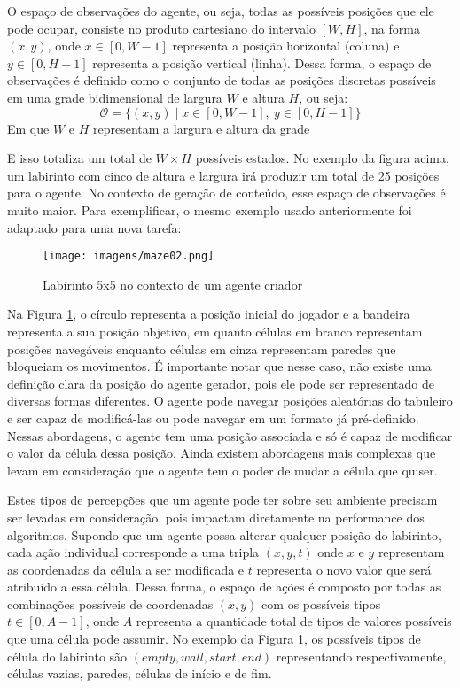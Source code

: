 O espaço de observações do agente, ou seja, todas as possíveis posições que ele pode ocupar, 
consiste no produto cartesiano do intervalo \([W, H]\), na forma \((x, y)\), onde \(x \in [0, W-1]\) 
representa a posição horizontal (coluna) e \(y \in [0, H-1]\) representa a posição vertical (linha). 
Dessa forma, o espaço de observações é definido como o conjunto de todas as posições discretas possíveis 
em uma grade bidimensional de largura \(W\) e altura \(H\), ou seja:
\[
\mathcal{O} = \{(x, y) \mid x \in [0, W-1],\ y \in [0, H-1]\}
\]
\noindent Em que \(W\) e \(H\) representam a largura e altura da grade

E isso totaliza um total de \(W \times H\) possíveis estados. No exemplo da figura acima, um labirinto com 
cinco de altura e largura irá produzir um total de 25 posições para o agente. No contexto de geração de
conteúdo, esse espaço de observações é muito maior. Para exemplificar, o mesmo exemplo usado anteriormente
foi adaptado para uma nova tarefa:

\begin{figure}[htb]
	\caption{\label{ref-maze02}Labirinto 5x5 no contexto de um agente criador}
	\begin{center}
	    \texttt{[image: imagens/maze02.png]}
	\end{center}
\end{figure}

\FloatBarrier

Na Figura \ref{ref-maze02}, o círculo representa a posição inicial do jogador e a bandeira 
representa a sua posição objetivo, em quanto células em branco representam
posições navegáveis enquanto células em cinza representam paredes que bloqueiam os
movimentos. É importante notar que nesse caso, não existe uma definição clara da posição
do agente gerador, pois ele pode ser representado de diversas formas diferentes.
O agente pode navegar posições aleatórias do tabuleiro e ser capaz de modificá-las ou 
pode navegar em um formato já pré-definido. Nessas abordagens, o agente tem uma posição
associada e só é capaz de modificar o valor da célula dessa posição. Ainda existem abordagens 
mais complexas que levam em consideração que o agente tem o poder de mudar a célula que quiser.

Estes tipos de percepções que um agente pode ter sobre seu ambiente precisam ser levadas em
consideração, pois impactam diretamente na performance dos algoritmos.  Supondo que um agente possa alterar qualquer 
posição do labirinto, cada ação individual corresponde a uma tripla
\((x, y, t)\) onde \(x\) e \(y\) representam as coordenadas da célula a ser modificada e \(t\) representa
o novo valor que será atribuído a essa célula. Dessa forma, o espaço de ações é composto por 
todas as combinações possíveis de coordenadas 
\((x, y)\) com os possíveis tipos \(t \in [0, A-1]\), onde \(A\) representa a quantidade total 
de tipos de valores possíveis que uma célula pode assumir. No exemplo da Figura \ref{ref-maze02}, os 
possíveis tipos de célula do labirinto são \((empty, wall, start, end)\) representando respectivamente, células vazias, 
paredes, células de início e de fim.


